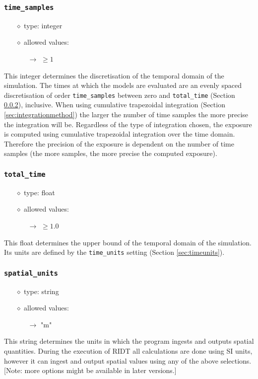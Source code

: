 \documentclass[]{article}
\def\code#1{\texttt{#1}}
\begin{document}
\subsubsection{\code{time\_samples}}\label{sec:timesamples}
\begin{itemize}
    \item[$\diamond$] type: integer 
    \item[$\diamond$] allowed values:
    \begin{itemize}
        \item[$\rightarrow$] $\geq1$
    \end{itemize}
\end{itemize}
This integer determines the discretisation of the temporal domain of the
simulation. The times at which the models are evaluated are an evenly spaced
discretisation of order \code{time\_samples} between zero and \code{total\_time}
(Section \ref{sec:totaltime}), inclusive. When using cumulative trapezoidal
integration (Section \ref{sec:integrationmethod}) the larger the number of time
samples the more precise the integration will be. Regardless of the type of
integration chosen, the exposure is computed using cumulative trapezoidal
integration over the time domain. Therefore the precision of the exposure is
dependent on the number of time samples (the more samples, the more precise the
computed exposure).

\subsubsection{\code{total\_time}}\label{sec:totaltime}
\begin{itemize}
    \item[$\diamond$] type: float 
    \item[$\diamond$] allowed values:
    \begin{itemize}
        \item[$\rightarrow$] $\geq1.0$
    \end{itemize}
\end{itemize}
This float determines the upper bound of the temporal domain of the simulation.
Its units are defined by the \code{time\_units} setting (Section
\ref{sec:timeunits}).

\subsubsection{\code{spatial\_units}}\label{sec:spatialunits}
\begin{itemize}
    \item[$\diamond$] type: string 
    \item[$\diamond$] allowed values:
    \begin{itemize}
        \item[$\rightarrow$] "m"
    \end{itemize}
\end{itemize}
This string determines the units in which the program ingests and outputs spatial
quantities. During the execution of RIDT all calculations are done using SI
units, however it can ingest and output spatial values using any of the above
selections. [Note: more options might be available in later versions.]
\end{document}
